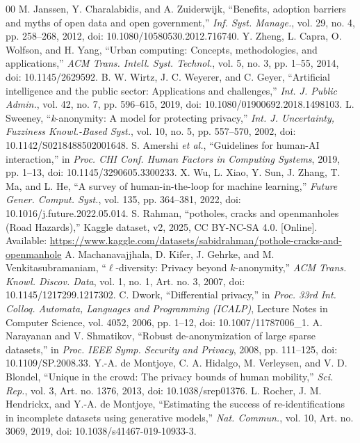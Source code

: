 \documentclass{ieeeaccess}
\begin{document}
\begin{thebibliography}{00}
 M. Janssen, Y. Charalabidis, and A. Zuiderwijk, ``Benefits, adoption barriers and myths of open data and open government,'' \textit{Inf. Syst. Manage.}, vol. 29, no. 4, pp. 258--268, 2012, doi: 10.1080/10580530.2012.716740.
 Y. Zheng, L. Capra, O. Wolfson, and H. Yang, ``Urban computing: Concepts, methodologies, and applications,'' \textit{ACM Trans. Intell. Syst. Technol.}, vol. 5, no. 3, pp. 1--55, 2014, doi: 10.1145/2629592.
 B. W. Wirtz, J. C. Weyerer, and C. Geyer, ``Artificial intelligence and the public sector: Applications and challenges,'' \textit{Int. J. Public Admin.}, vol. 42, no. 7, pp. 596--615, 2019, doi: 10.1080/01900692.2018.1498103.
 L. Sweeney, ``\textit{k}-anonymity: A model for protecting privacy,'' \textit{Int. J. Uncertainty, Fuzziness Knowl.-Based Syst.}, vol. 10, no. 5, pp. 557--570, 2002, doi: 10.1142/S0218488502001648.
 S. Amershi \textit{et al.}, ``Guidelines for human-AI interaction,'' in \textit{Proc. CHI Conf. Human Factors in Computing Systems}, 2019, pp. 1--13, doi: 10.1145/3290605.3300233.
 X. Wu, L. Xiao, Y. Sun, J. Zhang, T. Ma, and L. He, ``A survey of human-in-the-loop for machine learning,'' \textit{Future Gener. Comput. Syst.}, vol. 135, pp. 364--381, 2022, doi: 10.1016/j.future.2022.05.014.
 S. Rahman, ``potholes, cracks and openmanholes (Road Hazards),'' Kaggle dataset, v2, 2025, CC BY-NC-SA 4.0. [Online]. Available: \url{https://www.kaggle.com/datasets/sabidrahman/pothole-cracks-and-openmanhole}
 A. Machanavajjhala, D. Kifer, J. Gehrke, and M. Venkitasubramaniam, ``$\ell$-diversity: Privacy beyond $k$-anonymity,'' \textit{ACM Trans. Knowl. Discov. Data}, vol. 1, no. 1, Art. no. 3, 2007, doi: 10.1145/1217299.1217302.
 C. Dwork, ``Differential privacy,'' in \textit{Proc. 33rd Int. Colloq. Automata, Languages and Programming (ICALP)}, Lecture Notes in Computer Science, vol. 4052, 2006, pp. 1--12, doi: 10.1007/11787006\_1.
 A. Narayanan and V. Shmatikov, ``Robust de-anonymization of large sparse datasets,'' in \textit{Proc. IEEE Symp. Security and Privacy}, 2008, pp. 111--125, doi: 10.1109/SP.2008.33.
 Y.-A. de Montjoye, C. A. Hidalgo, M. Verleysen, and V. D. Blondel, ``Unique in the crowd: The privacy bounds of human mobility,'' \textit{Sci. Rep.}, vol. 3, Art. no. 1376, 2013, doi: 10.1038/srep01376.
 L. Rocher, J. M. Hendrickx, and Y.-A. de Montjoye, ``Estimating the success of re-identifications in incomplete datasets using generative models,'' \textit{Nat. Commun.}, vol. 10, Art. no. 3069, 2019, doi: 10.1038/s41467-019-10933-3.

\end{thebibliography}
\end{document}
